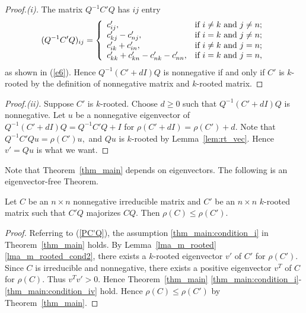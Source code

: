 \documentclass{beamer}
\begin{document}
\begin{frame}
    \begin{proof}[Proof.(i)]
        The matrix $Q^{-1}C'Q$ has $ij$ entry
        $$(Q^{-1}C'Q)_{ij}=\left\{
                             \begin{array}{ll}
                               c'_{ij}, & \hbox{if $i\not=k$ and $j\not=n$;} \\
                               c'_{kj}-c'_{nj}, & \hbox{if $i=k$ and $j\not=n$;} \\
                               c'_{ik}+c'_{in}, & \hbox{if $i\not=k$ and $j=n$;} \\ 
                               c'_{kk}+c'_{kn}-c'_{nk}-c'_{nn}, & \hbox{if $i=k$ and $j=n$},
                             \end{array}
                           \right.$$
        as shown in (\ref{e6}). 
        Hence $Q^{-1}(C'+dI)Q$ is nonnegative if and only if $C'$ is $k$-rooted by the definition of nonnegative matrix and $k$-rooted matrix.
         
    \end{proof}
\end{frame}

\begin{frame}
    \begin{proof}[Proof.(ii)]
        Suppose $C'$ is $k$-rooted. Choose $d\geq 0$ such that $Q^{-1}(C'+dI)Q$ is nonnegative.  
    Let $u$ be a nonnegative eigenvector of $Q^{-1}(C'+dI)Q=Q^{-1}C'Q+I$ for $\rho(C'+dI)=\rho(C')+d.$
    Note that $Q^{-1}C'Qu=\rho(C')u,$ and $Qu$ is $k$-rooted by Lemma~\ref{lem:rt_vec}. Hence $v'=Qu$ is what we want. 
    \end{proof}
    
\end{frame}

\begin{frame}
    Note that Theorem~\ref{thm_main} depends on eigenvectors. The following is an eigenvector-free Theorem. 


\begin{theorem}\label{thm:conclusion}
    Let $C$ be an $n\times n$ nonnegative irreducible matrix and $C'$ be an $n\times n$ $k$-rooted matrix such that $C'Q$ majorizes $CQ$. 
 Then $\rho(C)\leq \rho(C')$. 
\end{theorem}

\begin{proof} Referring to (\ref{PC'Q}), the assumption \ref{thm_main:condition_i} in  Theorem~\ref{thm_main} holds. 
By Lemma~\ref{lma_m_rooted} \ref{lma_m_rooted_cond2}, there exists a  $k$-rooted eigenvector $v'$ of $C'$  for $\rho(C')$. 
Since $C$ is irreducible and nonnegative, there exists a positive eigenvector $v^T$ of $C$ for $\rho(C).$ 
Thus $v^Tv'>0$. Hence Theorem~\ref{thm_main} \ref{thm_main:condition_i}-\ref{thm_main:condition_iv} hold.
Hence  $\rho(C) \leq \rho(C')$ by   Theorem~\ref{thm_main}.
\end{proof}
\end{frame}
\end{document}
